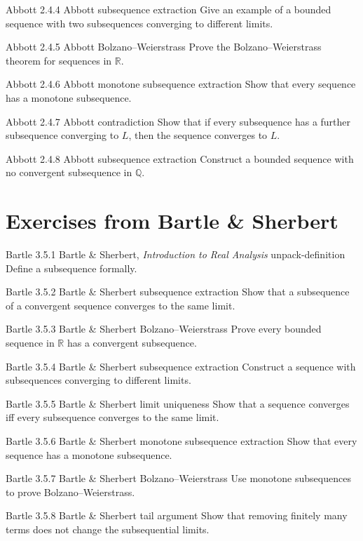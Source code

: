 \exstub
{Abbott 2.4.4}
{Abbott}
{subsequence extraction}
{Give an example of a bounded sequence with two subsequences
converging to different limits.}

\exstub
{Abbott 2.4.5}
{Abbott}
{Bolzano–Weierstrass}
{Prove the Bolzano–Weierstrass theorem for sequences in $\mathbb{R}$.}

\exstub
{Abbott 2.4.6}
{Abbott}
{monotone subsequence extraction}
{Show that every sequence has a monotone subsequence.}

\exstub
{Abbott 2.4.7}
{Abbott}
{contradiction}
{Show that if every subsequence has a further subsequence
converging to $L$, then the sequence converges to $L$.}

\exstub
{Abbott 2.4.8}
{Abbott}
{subsequence extraction}
{Construct a bounded sequence with no convergent subsequence
in $\mathbb{Q}$.}


\section*{Exercises from Bartle \& Sherbert}

\exstub
{Bartle 3.5.1}
{Bartle \& Sherbert, \textit{Introduction to Real Analysis}}
{unpack-definition}
{Define a subsequence formally.}

\exstub
{Bartle 3.5.2}
{Bartle \& Sherbert}
{subsequence extraction}
{Show that a subsequence of a convergent sequence converges
to the same limit.}

\exstub
{Bartle 3.5.3}
{Bartle \& Sherbert}
{Bolzano–Weierstrass}
{Prove every bounded sequence in $\mathbb{R}$ has a convergent
subsequence.}

\exstub
{Bartle 3.5.4}
{Bartle \& Sherbert}
{subsequence extraction}
{Construct a sequence with subsequences converging to
different limits.}

\exstub
{Bartle 3.5.5}
{Bartle \& Sherbert}
{limit uniqueness}
{Show that a sequence converges iff every subsequence
converges to the same limit.}

\exstub
{Bartle 3.5.6}
{Bartle \& Sherbert}
{monotone subsequence extraction}
{Show that every sequence has a monotone subsequence.}

\exstub
{Bartle 3.5.7}
{Bartle \& Sherbert}
{Bolzano–Weierstrass}
{Use monotone subsequences to prove Bolzano–Weierstrass.}

\exstub
{Bartle 3.5.8}
{Bartle \& Sherbert}
{tail argument}
{Show that removing finitely many terms does not change
the subsequential limits.}

